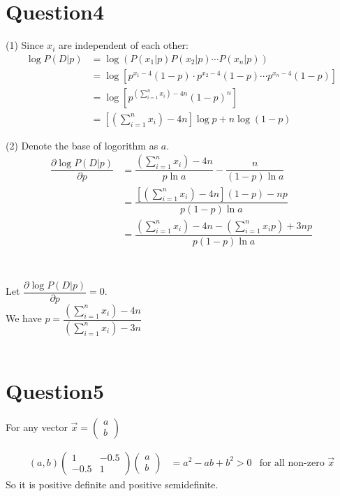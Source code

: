 \documentclass{amsart}
\begin{document}
\section{Question4}\label{sec:q4}
(1)
Since $x_i$ are independent of each other:
\begin{align*}
	\log P(D|p)&= \log(P(x_1|p)P(x_2|p)\cdots P(x_n|p))\\
	&= \log[p^{x_1-4}(1-p)\cdot p^{x_2-4}(1-p)\cdots p^{x_n-4}(1-p)]\\
	&= \log[p^{(\sum\limits_{i=1}^{n}x_i)-4n}(1-p)^n]\\
	&= [(\sum\limits_{i=1}^{n}x_i)-4n] \log p + n \log(1-p)
\end{align*}

(2)
Denote the base of logorithm as $a$.
\begin{align*}
	\dfrac{\partial \log P(D|p)}{\partial p} &= \dfrac{(\sum\limits_{i=1}^{n}x_i)-4n}{p\ln a} - \dfrac{n}{(1-p)\ln a}\\
	&= \dfrac{[(\sum\limits_{i=1}^{n}x_i)-4n](1-p) - np}{p(1-p)\ln a}\\
	&= \dfrac{(\sum\limits_{i=1}^{n}x_i)-4n - (\sum\limits_{i=1}^{n}x_ip)+3np}{p(1-p)\ln a}
	\\
\end{align*}
\\
\\
Let $\dfrac{\partial \log P(D|p)}{\partial p} = 0$.
\\
We have $p=\dfrac{(\sum\limits_{i=1}^{n}x_i)-4n}{(\sum\limits_{i=1}^{n}x_i)-3n}$ 
\\
\\
\section{Question5}\label{sec:q5}
For any vector $\vec{x}=
	\left(
\begin{matrix}
	a\\
	b
\end{matrix}
\right)$

\begin{align}
	(a,b)\left(
	\begin{matrix}
		1 & -0.5\\
		-0.5 & 1
	\end{matrix}
	\right)
	\left(
	\begin{matrix}
		a\\
		b
	\end{matrix}
	\right)&=a^2-ab+b^2 > 0 &\text{for all non-zero $\vec{x}$}
\end{align}
So it is positive definite and positive semidefinite.
\end{document}
